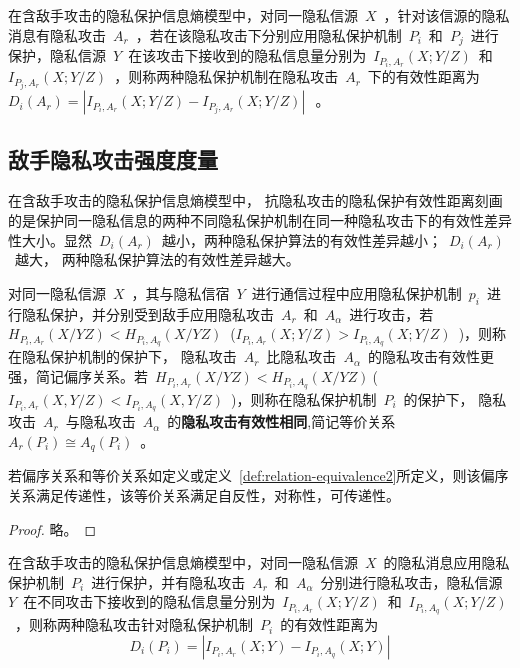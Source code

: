 \begin{definition}[抗隐私攻击的隐私保护有效性距离]
	\label{def:privacy-preserving-performance-distance}
	在含敌手攻击的隐私保护信息熵模型中，对同一隐私信源~$X$~，针对该信源的隐私消息有隐私攻击~$A_{r}$~，若在该隐私攻击下分别应用隐私保护机制~$P_{i}$~和~$P_{j}$~进行保护，隐私信源~$Y$~在该攻击下接收到的隐私信息量分别为~$I_{P_{i},A_{r}}(X;Y/Z)$~和~$I_{P_{j},A_{r}}(X;Y/Z)$~，则称两种隐私保护机制在隐私攻击~$A_{r}$~下的有效性距离为~$D_{i}(A_{r})=\left | I_{P_{i},A_{r}}(X;Y/Z)-I_{P_{j},A_{r}}(X;Y/Z) \right |~$~。
\end{definition}

\subsection{敌手隐私攻击强度度量}
在含敌手攻击的隐私保护信息熵模型中， 抗隐私攻击的隐私保护有效性距离刻画的是保护同一隐私信息的两种不同隐私保护机制在同一种隐私攻击下的有效性差异性大小。显然~$D_{i}(A_{r})$~越小，两种隐私保护算法的有效性差异越小；~$D_{i}(A_{r})$~越大， 两种隐私保护算法的有效性差异越大。

\begin{definition}
	\label{def:relation-equivalence2}
	 对同一隐私信源~$X$~，其与隐私信宿~$Y$~进行通信过程中应用隐私保护机制~$p_{i}$~进行隐私保护，并分别受到敌手应用隐私攻击~$A_{r}$~和~$A_{\alpha }$~进行攻击，若~${{H}_{{{P}_{i}},{{A}_{r}}}}(X/YZ)<{{H}_{{{P}_{i}},{{A}_{q}}}}(X/YZ)~$ (${{I}_{{{P}_{i}},{{A}_{r}}}}(X;Y/Z)>{{I}_{{{P}_{i}},{{A}_{q}}}}(X;Y/Z)$~)，则称在隐私保护机制的保护下， 隐私攻击~$A_{r}$~比隐私攻击~$A_{\alpha }$~的隐私攻击有效性更强，简记偏序关系。若~$H_{P_{i},A_{r}}(X/YZ)<H_{P_{i},A_{q}}(X/YZ)~$(~$I_{P_{i},A_{r}}(X,Y/Z)<I_{P_{i},A_{q}}(X,Y/Z)$~)，则称在隐私保护机制~$P_{i}$~的保护下， 隐私攻击~$A_{r}$~与隐私攻击~$A_{\alpha }$~的\textbf{隐私攻击有效性相同},简记等价关系~$A_{r}(P_{i})\cong A_{q}(P_{i})$~。
\end{definition}

\begin{theorem}
	\label{thm:relation-equivalence}
	若偏序关系和等价关系如定义\label{def:relation-equivalence1}或定义~\ref{def:relation-equivalence2}所定义，则该偏序关系满足传递性，该等价关系满足自反性，对称性，可传递性。 
\end{theorem}

\begin{proof}
 略。
\end{proof}


\begin{definition}[隐私攻击有效性距离]
	\label{def:privacy-attack-distance}
	在含敌手攻击的隐私保护信息熵模型中，对同一隐私信源~$X$~的隐私消息应用隐私保护机制~$P_{i}$~进行保护，并有隐私攻击~$A_{r}$~和~$A_{\alpha}$~分别进行隐私攻击，隐私信源~$Y$~在不同攻击下接收到的隐私信息量分别为~$I_{P_{i},A_{r}}(X;Y/Z)$~和~$I_{P_{i},A_{q}}(X;Y/Z)$~，则称两种隐私攻击针对隐私保护机制~$P_{i}$~的有效性距离为
\begin{equation}
D_{i}(P_{i})=\left | I_{P_{i},A_{r}}(X;Y)-I_{P_{i},A_{q}}(X;Y) \right |
\end{equation}
\end{definition}

